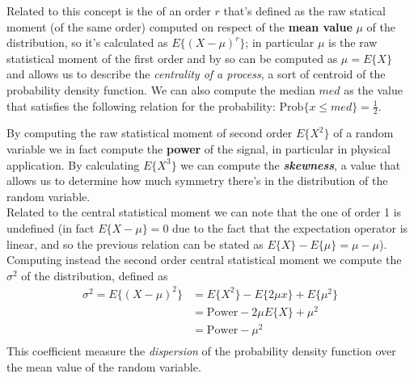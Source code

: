 	Related to this concept is the  of an order $r$ that's defined as the raw statical moment (of the same order) computed on respect of the \textbf{mean value} $\mu$ of the distribution, so it's calculated as $E\big\{(X-\mu)^r\big\}$; in particular $\mu$ is the raw statistical moment of the first order and by so can be computed as $\mu = E\{X\}$ and allows us to describe the \textit{centrality of a process}, a sort of centroid of the probability density function. We can also compute the median $med$ as the value that satisfies the following relation for the probability: $\textrm{Prob} \{x\leq med\} = \frac 1 2$.
	
	By computing the raw statistical moment of second order $E\big\{X^2\big\}$ of a random variable we in fact compute the \textbf{power} of the signal, in particular in physical application. By calculating $E\big\{X^3\big\}$ we can compute the \textbf{\textit{skewness}}, a value that allows us to determine how much symmetry there's in the distribution of the random variable.\\
	Related to the central statistical moment we can note that the one of order 1 is undefined (in fact $E\{X-\mu\} =0 $ due to the fact that the expectation operator is linear, and so the previous relation can be stated as $E\{X\} - E\{\mu\} = \mu - \mu$). Computing instead the second order central statistical moment we compute the  $\sigma^2$ of the distribution, defined as 
	\begin{equation}
	\begin{split}
		\sigma^2 = E\big\{(X-\mu)^2\big\} & = E\{X^2\} - E\{2\mu x\} + E\{\mu^2\} \\
		& = \textrm{Power} - 2 \mu E\{X\} + \mu^2 \\
		& = \textrm{Power} - \mu^2 \\
	\end{split}
	\end{equation}
	This coefficient measure the \textit{dispersion} of the probability density function over the mean value of the random variable.
	
